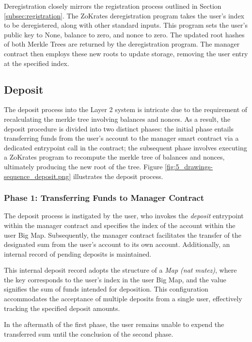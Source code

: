 Deregistration closely mirrors the registration process outlined in Section \ref{subsec:registration}. The ZoKrates deregistration program takes the user's index to be deregistered, along with other standard inputs. This program sets the user's public key to None, balance to zero, and nonce to zero. The updated root hashes of both Merkle Trees are returned by the deregistration program. The manager contract then employs these new roots to update storage, removing the user entry at the specified index.

\subsection{Deposit\label{subsec:deposit}}
The deposit process into the Layer 2 system is intricate due to the requirement of recalculating the merkle tree involving balances and nonces. As a result, the deposit procedure is divided into two distinct phases: the initial phase entails transferring funds from the user's account to the manager smart contract via a dedicated entrypoint call in the contract; the subsequent phase involves executing a ZoKrates program to recompute the merkle tree of balances and nonces, ultimately producing the new root of the tree. Figure \ref{fig:5_drawings-sequence_deposit.png} illustrates the deposit process.

\subsubsection{Phase 1: Transferring Funds to Manager Contract}
The deposit process is instigated by the user, who invokes the \textit{deposit} entrypoint within the manager contract and specifies the index of the account within the user Big Map. Subsequently, the manager contract facilitates the transfer of the designated sum from the user's account to its own account. Additionally, an internal record of pending deposits is maintained.

This internal deposit record adopts the structure of a \textit{Map (nat mutez)}, where the key corresponds to the user's index in the user Big Map, and the value signifies the sum of funds intended for deposition. This configuration accommodates the acceptance of multiple deposits from a single user, effectively tracking the specified deposit amounts.

In the aftermath of the first phase, the user remains unable to expend the transferred sum until the conclusion of the second phase.


